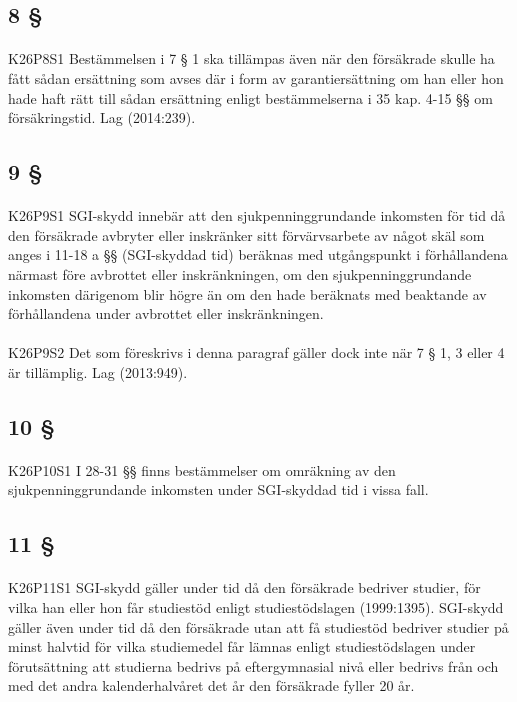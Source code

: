 \documentclass[a4paper,notitlepage,openany,10pt]{book}
\begin{document}
\subsection*{8 §}
\paragraph*{}
{\tiny K26P8S1}
Bestämmelsen i 7 § 1 ska tillämpas även när den försäkrade skulle ha fått sådan ersättning som avses där i form av garantiersättning om han eller hon hade haft rätt till sådan ersättning enligt bestämmelserna i 35 kap. 4-15 §§ om försäkringstid.
Lag (2014:239).
\subsection*{9 §}
\paragraph*{}
{\tiny K26P9S1}
SGI-skydd innebär att den sjukpenninggrundande inkomsten för tid då den försäkrade avbryter eller inskränker sitt förvärvsarbete av något skäl som anges i 11-18 a §§ (SGI-skyddad tid) beräknas med utgångspunkt i förhållandena närmast före avbrottet eller inskränkningen, om den sjukpenninggrundande inkomsten därigenom blir högre än om den hade beräknats med beaktande av förhållandena under avbrottet eller inskränkningen.
\paragraph*{}
{\tiny K26P9S2}
Det som föreskrivs i denna paragraf gäller dock inte när 7 § 1, 3 eller 4 är tillämplig.
Lag (2013:949).
\subsection*{10 §}
\paragraph*{}
{\tiny K26P10S1}
I 28-31 §§ finns bestämmelser om omräkning av den sjukpenninggrundande inkomsten under SGI-skyddad tid i vissa fall.
\subsection*{11 §}
\paragraph*{}
{\tiny K26P11S1}
SGI-skydd gäller under tid då den försäkrade bedriver studier, för vilka han eller hon får studiestöd enligt studiestödslagen (1999:1395). SGI-skydd gäller även under tid då den försäkrade utan att få studiestöd bedriver studier på minst halvtid för vilka studiemedel får lämnas enligt studiestödslagen under förutsättning att studierna bedrivs på eftergymnasial nivå eller bedrivs från och med det andra kalenderhalvåret det år den försäkrade fyller 20 år.
\end{document}
